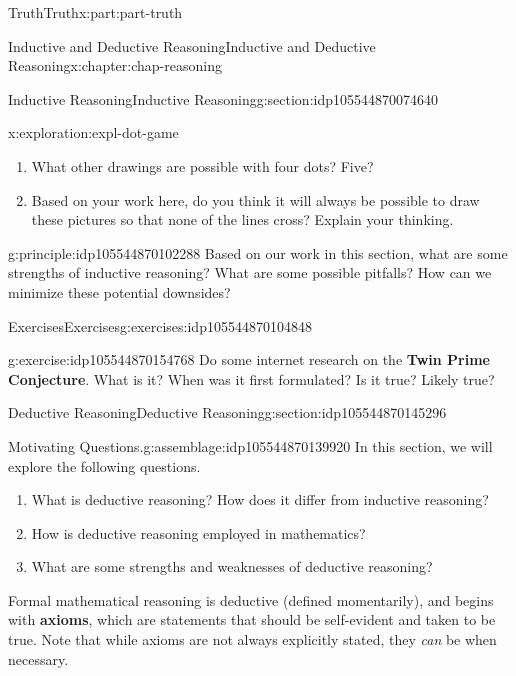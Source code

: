 \documentclass[oneside,10pt,]{book}
\newcommand{\terminology}[1]{\textbf{#1}}
\numberwithin{equation}{section}
\begin{document}
\begin{partptx}{Truth}{}{Truth}{}{}{x:part:part-truth}
\begin{chapterptx}{Inductive and Deductive Reasoning}{}{Inductive and Deductive Reasoning}{}{}{x:chapter:chap-reasoning}
\begin{sectionptx}{Inductive Reasoning}{}{Inductive Reasoning}{}{}{g:section:idp105544870074640}
\begin{exploration}{}{x:exploration:expl-dot-game}
\begin{enumerate}
\item{}What other drawings are possible with four dots? Five?%
\item{}Based on your work here, do you think it will always be possible to draw these pictures so that none of the lines cross? Explain your thinking.%
\end{enumerate}
\end{exploration}%
\begin{principle}{}{}{g:principle:idp105544870102288}%
Based on our work in this section, what are some strengths of inductive reasoning? What are some possible pitfalls? How can we minimize these potential downsides?%
\end{principle}
%
%
\typeout{************************************************}
\typeout{************************************************}
%
\begin{exercises-subsection-numberless}{Exercises}{}{Exercises}{}{}{g:exercises:idp105544870104848}
\begin{divisionexercise}{1}{}{}{g:exercise:idp105544870154768}%
Do some internet research on the \terminology{Twin Prime Conjecture}. What is it? When was it first formulated? Is it true? Likely true?%
\end{divisionexercise}%
\end{exercises-subsection-numberless}
\end{sectionptx}
%
%
\typeout{************************************************}
\typeout{************************************************}
%
\begin{sectionptx}{Deductive Reasoning}{}{Deductive Reasoning}{}{}{g:section:idp105544870145296}
\begin{assemblage}{Motivating Questions.}{g:assemblage:idp105544870139920}%
In this section, we will explore the following questions. %
\begin{enumerate}
\item{}What is deductive reasoning? How does it differ from inductive reasoning?%
\item{}How is deductive reasoning employed in mathematics?%
\item{}What are some strengths and weaknesses of deductive reasoning?%
\end{enumerate}
%
\end{assemblage}
Formal mathematical reasoning is deductive (defined momentarily), and begins with \terminology{axioms}, which are statements that should be self-evident and taken to be true. Note that while axioms are not always explicitly stated, they \emph{can} be when necessary.%

\end{sectionptx}
\end{chapterptx}
\end{partptx}
\end{document}

